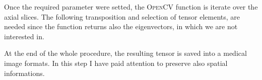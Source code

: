 \documentclass{standalone}
\begin{document}
	Once the required parameter were setted, the \textsc{OpenCV} function is iterate over the axial slices. The following transposition and selection of tensor elements, are needed since the function returns also the eigenvectors, in which we are not interested in. 
	
	At the end of the whole procedure, the resulting tensor is saved into a medical image formats. In this step I have paid attention to preserve also spatial informations.
	
	

	
	
	
	 
	
\end{document}
